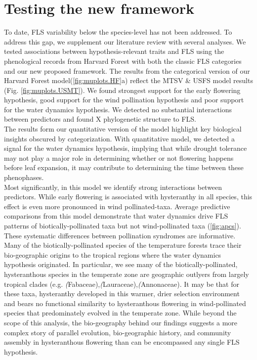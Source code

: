 \documentclass{article}
\begin{document}
{\section*{Testing the new framework}

To date, FLS variability below the species-level has not been addressed. To address this gap, we supplement our literature review with several analyses. We tested associations between hypothesis-relevant traits and FLS using the phenological records from Harvard Forest with both the classic FLS categories and our new proposed framework. The results from the categorical version of our Harvard Forest model(\ref{fig:muplots.HF}a) reflect the MTSV & USFS model results (Fig. \ref{fig:muplots.USMT}). We found strongest support for the early flowering hypothesis, good support for the wind pollination hypothesis and poor support for the water dynamics hypothesis. We detected no substantial interactions between predictors and found X phylogenetic structure to FLS. \\

\noindent The results form our quantitative version of the model highlight key biological insights obscured by categorization. With quantitative model, we detected a signal for the water dynamics hypothesis, implying that while drought tolerance may not play a major role in determining whether or not flowering happens before leaf expansion, it may contribute to determining the time between these phenophases.\\

\noindent Most significantly, in this model we identify strong interactions between predictors. While early flowering is associated with hysteranthy in all species, this effect is even more pronounced in wind pollinated-taxa. Average predictive comparisons from this model demonstrate that water dynamics drive FLS patterns of biotically-pollinated taxa but not wind-pollinated taxa (\ref{fig:apcs}). These systematic differences between pollination syndromes are informative. Many of the biotically-pollinated species of the temperature forests trace their bio-geographic origins to the tropical regions \citep{Daubenmire1972} where the water dynamics hypothesis originated\citep{Janzen1967,Franklin2016}. In particular, we see many of the biotically-pollinated, hysteranthous species in the temperate zone are geographic outlyers from largely tropical clades (e.g. \textit(Fabaceae),\textit(Lauraceae),\textit(Annonaceae). It may be that for these taxa, hysteranthy developed in this warmer, drier selection environment and bears no functional similarity to hysteranthous flowering in wind-pollinated species that predominately evolved in the temperate zone. While beyond the scope of this analysis, the bio-geography behind our findings suggests a more complex story of parallel evolution, bio-geographic history, and community assembly in hysteranthous flowering than can be encompassed any single FLS hypothesis.\\

}
\end{document}
